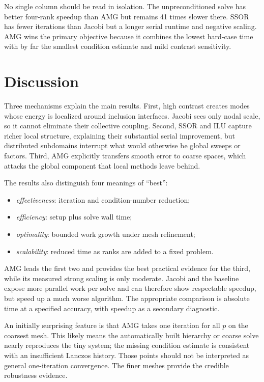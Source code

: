 \documentclass[10pt,a4paper]{article}
\begin{document}
No single column should be read in isolation. The unpreconditioned solve has better four-rank
speedup than AMG but remains 41 times slower there. SSOR has fewer iterations than Jacobi but a
longer serial runtime and negative scaling. AMG wins the primary objective because it combines the
lowest hard-case time with by far the smallest condition estimate and mild contrast sensitivity.

\newpage
\section{Discussion}
Three mechanisms explain the main results. First, high contrast creates modes whose energy is
localized around inclusion interfaces. Jacobi sees only nodal scale, so it cannot eliminate their
collective coupling. Second, SSOR and ILU capture richer local structure, explaining their substantial
serial improvement, but distributed subdomains interrupt what would otherwise be global sweeps or
factors. Third, AMG explicitly transfers smooth error to coarse spaces, which attacks the global
component that local methods leave behind.

The results also distinguish four meanings of ``best'':
\begin{itemize}
 \item \emph{effectiveness}: iteration and condition-number reduction;
 \item \emph{efficiency}: setup plus solve wall time;
 \item \emph{optimality}: bounded work growth under mesh refinement;
 \item \emph{scalability}: reduced time as ranks are added to a fixed problem.
\end{itemize}
AMG leads the first two and provides the best practical evidence for the third, while its measured
strong scaling is only moderate. Jacobi and the baseline expose more parallel work per solve and can
therefore show respectable speedup, but speed up a much worse algorithm. The appropriate comparison
is absolute time at a specified accuracy, with speedup as a secondary diagnostic.

An initially surprising feature is that AMG takes one iteration for all $p$ on the coarsest mesh.
This likely means the automatically built hierarchy or coarse solve nearly reproduces the tiny
system; the missing condition estimate is consistent with an insufficient Lanczos history. Those
points should not be interpreted as general one-iteration convergence. The finer meshes provide the
credible robustness evidence.
\end{document}
